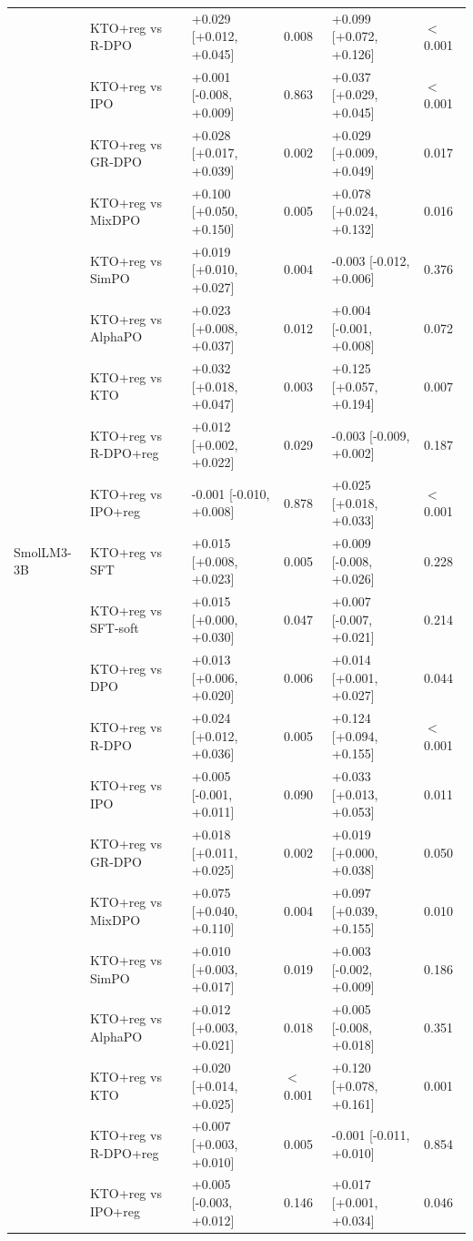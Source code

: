 \begin{table}[t]
\begin{tabular}{llllll}
 & KTO+reg vs R-DPO & +0.029 [+0.012, +0.045] & 0.008 & +0.099 [+0.072, +0.126] & $<$0.001 \\
 & KTO+reg vs IPO & +0.001 [-0.008, +0.009] & 0.863 & +0.037 [+0.029, +0.045] & $<$0.001 \\
 & KTO+reg vs GR-DPO & +0.028 [+0.017, +0.039] & 0.002 & +0.029 [+0.009, +0.049] & 0.017 \\
 & KTO+reg vs MixDPO & +0.100 [+0.050, +0.150] & 0.005 & +0.078 [+0.024, +0.132] & 0.016 \\
 & KTO+reg vs SimPO & +0.019 [+0.010, +0.027] & 0.004 & -0.003 [-0.012, +0.006] & 0.376 \\
 & KTO+reg vs AlphaPO & +0.023 [+0.008, +0.037] & 0.012 & +0.004 [-0.001, +0.008] & 0.072 \\
 & KTO+reg vs KTO & +0.032 [+0.018, +0.047] & 0.003 & +0.125 [+0.057, +0.194] & 0.007 \\
 & KTO+reg vs R-DPO+reg & +0.012 [+0.002, +0.022] & 0.029 & -0.003 [-0.009, +0.002] & 0.187 \\
 & KTO+reg vs IPO+reg & -0.001 [-0.010, +0.008] & 0.878 & +0.025 [+0.018, +0.033] & $<$0.001 \\
\addlinespace
SmolLM3-3B & KTO+reg vs SFT & +0.015 [+0.008, +0.023] & 0.005 & +0.009 [-0.008, +0.026] & 0.228 \\
 & KTO+reg vs SFT-soft & +0.015 [+0.000, +0.030] & 0.047 & +0.007 [-0.007, +0.021] & 0.214 \\
 & KTO+reg vs DPO & +0.013 [+0.006, +0.020] & 0.006 & +0.014 [+0.001, +0.027] & 0.044 \\
 & KTO+reg vs R-DPO & +0.024 [+0.012, +0.036] & 0.005 & +0.124 [+0.094, +0.155] & $<$0.001 \\
 & KTO+reg vs IPO & +0.005 [-0.001, +0.011] & 0.090 & +0.033 [+0.013, +0.053] & 0.011 \\
 & KTO+reg vs GR-DPO & +0.018 [+0.011, +0.025] & 0.002 & +0.019 [+0.000, +0.038] & 0.050 \\
 & KTO+reg vs MixDPO & +0.075 [+0.040, +0.110] & 0.004 & +0.097 [+0.039, +0.155] & 0.010 \\
 & KTO+reg vs SimPO & +0.010 [+0.003, +0.017] & 0.019 & +0.003 [-0.002, +0.009] & 0.186 \\
 & KTO+reg vs AlphaPO & +0.012 [+0.003, +0.021] & 0.018 & +0.005 [-0.008, +0.018] & 0.351 \\
 & KTO+reg vs KTO & +0.020 [+0.014, +0.025] & $<$0.001 & +0.120 [+0.078, +0.161] & 0.001 \\
 & KTO+reg vs R-DPO+reg & +0.007 [+0.003, +0.010] & 0.005 & -0.001 [-0.011, +0.010] & 0.854 \\
 & KTO+reg vs IPO+reg & +0.005 [-0.003, +0.012] & 0.146 & +0.017 [+0.001, +0.034] & 0.046 \\
\bottomrule
\end{tabular}
\end{table}

